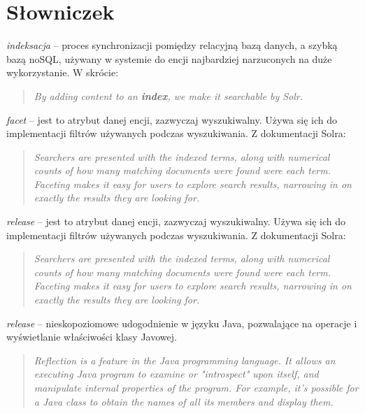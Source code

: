 \section{Słowniczek}
\noindent
\textit{indeksacja} -- proces synchronizacji pomiędzy relacyjną bazą danych, a szybką bazą noSQL, używany w systemie do encji najbardziej narzuconych na duże wykorzystanie. W skrócie: 
\begin{quote}
	\textit{By adding content to an \textbf{index}, we make it searchable by Solr.}\cite{Solr} 
\end{quote}


\noindent
\textit{facet} -- jest to atrybut danej encji, zazwyczaj wyszukiwalny. Używa się ich do implementacji filtrów używanych podczas wyszukiwania. Z dokumentacji Solra:
\begin{quote} \textit{
	Searchers are presented with the indexed terms, along with numerical counts of how many matching documents were found were each term. Faceting makes it easy for users to explore search results, narrowing in on exactly the results they are looking for.
	}\cite{Solr}
\end{quote}


\noindent
\textit{release} -- jest to atrybut danej encji, zazwyczaj wyszukiwalny. Używa się ich do implementacji filtrów używanych podczas wyszukiwania. Z dokumentacji Solra:
\begin{quote} \textit{
		Searchers are presented with the indexed terms, along with numerical counts of how many matching documents were found were each term. Faceting makes it easy for users to explore search results, narrowing in on exactly the results they are looking for.
	}\cite{Solr}
\end{quote}

\noindent
\textit{release} -- nieskopoziomowe udogodnienie w języku Java, pozwalające na operacje i wyświetlanie właściwości klasy Javowej.
\begin{quote} \textit{
		Reflection is a feature in the Java programming language. It allows an executing Java program to examine or "introspect" upon itself, and manipulate internal properties of the program. For example, it's possible for a Java class to obtain the names of all its members and display them.
	}\cite{oracle}
\end{quote}




